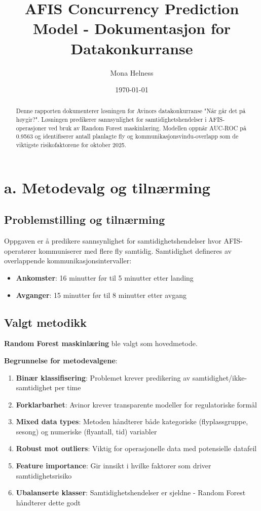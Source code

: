 \documentclass[11pt,a4paper]{article}
\title{AFIS Concurrency Prediction Model - Dokumentasjon for Datakonkurranse}
\author{Mona Helness}
\date{\today}
\begin{document}
\maketitle

\begin{abstract}
Denne rapporten dokumenterer løsningen for Avinors datakonkurranse "Når går det på høygir?". Løsningen predikerer sannsynlighet for samtidighetshendelser i AFIS-operasjoner ved bruk av Random Forest maskinlæring. Modellen oppnår AUC-ROC på 0.9563 og identifiserer antall planlagte fly og kommunikasjonsvindu-overlapp som de viktigste risikofaktorene for oktober 2025.
\end{abstract}

\section{a. Metodevalg og tilnærming}

\subsection{Problemstilling og tilnærming}
Oppgaven er å predikere sannsynlighet for samtidighetshendelser hvor AFIS-operatører kommuniserer med flere fly samtidig. Samtidighet defineres av overlappende kommunikasjonsintervaller:
\begin{itemize}
    \item \textbf{Ankomster}: 16 minutter før til 5 minutter etter landing
    \item \textbf{Avganger}: 15 minutter før til 8 minutter etter avgang
\end{itemize}

\subsection{Valgt metodikk}
\textbf{Random Forest maskinlæring} ble valgt som hovedmetode.

\textbf{Begrunnelse for metodevalgene}:
\begin{enumerate}
    \item \textbf{Binær klassifisering}: Problemet krever predikering av samtidighet/ikke-samtidighet per time
    \item \textbf{Forklarbarhet}: Avinor krever transparente modeller for regulatoriske formål
    \item \textbf{Mixed data types}: Metoden håndterer både kategoriske (flyplassgruppe, sesong) og numeriske (flyantall, tid) variabler
    \item \textbf{Robust mot outliers}: Viktig for operasjonelle data med potensielle datafeil
    \item \textbf{Feature importance}: Gir innsikt i hvilke faktorer som driver samtidighetsrisiko
    \item \textbf{Ubalanserte klasser}: Samtidighetshendelser er sjeldne - Random Forest håndterer dette godt
\end{enumerate}
\end{document}
